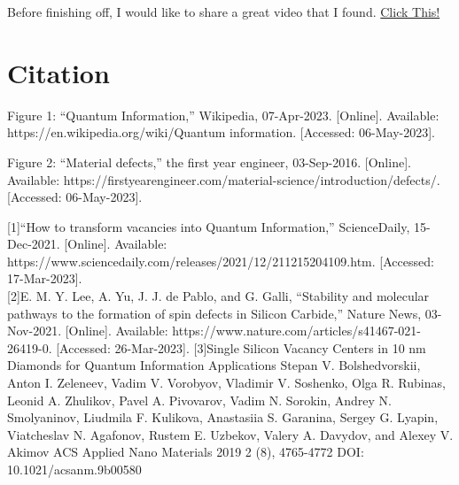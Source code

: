 \documentclass{article}
\begin{document}
Before finishing off, I would like to share a great video that I found. 
\href{https://www.youtube.com/watch?v=KZIyG9II514}{Click This!} 

\section{Citation}
Figure 1: “Quantum Information,” Wikipedia, 07-Apr-2023. [Online]. Available: https://en.wikipedia.org/wiki/Quantum information. [Accessed: 06-May-2023]. 

Figure 2: “Material defects,” the first year engineer, 03-Sep-2016. [Online]. Available: https://firstyearengineer.com/material-science/introduction/defects/. [Accessed: 06-May-2023]. 

[1]“How to transform vacancies into Quantum Information,” ScienceDaily, 15-Dec-2021. [Online]. Available: https://www.sciencedaily.com/releases/2021/12/211215204109.htm. [Accessed: 17-Mar-2023].  \\


[2]E. M. Y. Lee, A. Yu, J. J. de Pablo, and G. Galli, “Stability and molecular pathways to the formation of spin defects in Silicon Carbide,” Nature News, 03-Nov-2021. [Online]. Available: https://www.nature.com/articles/s41467-021-26419-0. [Accessed: 26-Mar-2023]. 
[3]Single Silicon Vacancy Centers in 10 nm Diamonds for Quantum Information Applications
Stepan V. Bolshedvorskii, Anton I. Zeleneev, Vadim V. Vorobyov, Vladimir V. Soshenko, Olga R. Rubinas, Leonid A. Zhulikov, Pavel A. Pivovarov, Vadim N. Sorokin, Andrey N. Smolyaninov, Liudmila F. Kulikova, Anastasiia S. Garanina, Sergey G. Lyapin, Viatcheslav N. Agafonov, Rustem E. Uzbekov, Valery A. Davydov, and Alexey V. Akimov
ACS Applied Nano Materials 2019 2 (8), 4765-4772
DOI: 10.1021/acsanm.9b00580
\end{document}
